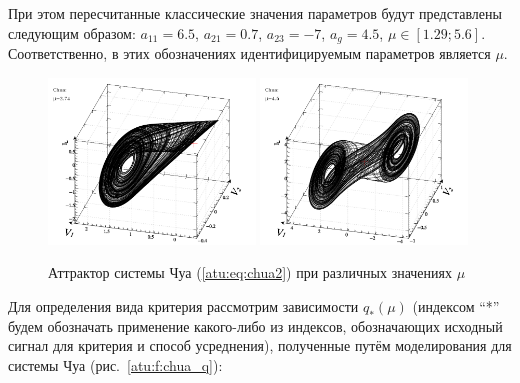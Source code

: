 При этом пересчитанные классические значения параметров будут представлены следующим образом:
$ a_{11} = 6.5 $, $a_{21} = 0.7$, $ a_{23} = -7 $, $ a_g = 4.5 $,
$ \mu \in [ 1.29 ; 5.6 ] $.
Соответственно, в этих обозначениях
идентифицируемым параметров является $\mu$.



\begin{figure}[htb!]
\centerline{
  \includegraphics[width=0.49\textwidth]{p/cha/chua/chua_1-p_xyz_mu=2x74.png}
  \includegraphics[width=0.49\textwidth]{p/cha/chua/chua_1-p_xyz_mu=4x50.png}
}
\caption{Аттрактор системы Чуа (\ref{atu:eq:chua2}) при различных значениях $\mu$}
\label{atu:f:chua_phase}
\end{figure}


Для определения вида критерия рассмотрим зависимости
$q_{*}(\mu) $ (индексом ``*'' будем обозначать применение какого-либо из индексов,
обозначающих исходный сигнал для критерия и способ усреднения),
полученные путём моделирования
для системы Чуа (рис.~\ref{atu:f:chua_q}):

